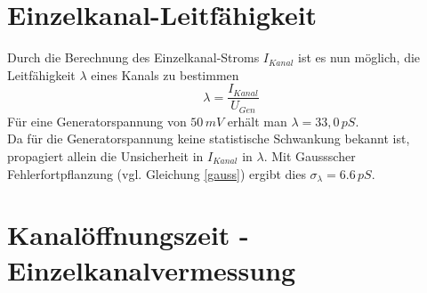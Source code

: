 \documentclass{include/thesisclass3}
\newcommand{\e}[1]{\,\si{#1}}
\begin{document}
\section{Einzelkanal-Leitfähigkeit}
Durch die Berechnung des Einzelkanal-Stroms $I_{Kanal}$ ist es nun möglich, die Leitfähigkeit $\lambda$ eines Kanals zu bestimmen
\[ \lambda = \frac{I_{Kanal}}{U_{Gen}}\]
Für eine Generatorspannung von $50\e{mV}$ erhält man $\lambda = 33,0\e{pS}$.\\
Da für die Generatorspannung keine statistische Schwankung bekannt ist, propagiert allein die Unsicherheit in $I_{Kanal}$ in $\lambda$. Mit Gaussscher Fehlerfortpflanzung (vgl. Gleichung \ref{gauss}) ergibt dies $\sigma_\lambda = 6.6\e{pS}$.


\section{Kanalöffnungszeit - Einzelkanalvermessung}
\end{document}
